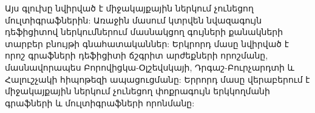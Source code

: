 Այս գլուխը նվիրված է միջակայքային ներկում չունեցող մուլտիգրաֆներին: Առաջին մասում կտրվեն նվազագույն դեֆիցիտով ներկումներում մասնակցող գույների քանակների տարբեր բնույթի գնահատականներ: 
Երկրորդ մասը նվիրված է որոշ գրաֆների դեֆիցիտի ճշգրիտ արժեքների որոշմանը, մասնավորապես Բորովիցկա-Օլշեվսկայի, Դրգաշ-Բուրչարդտի և Հալուշչակի հիպոթեզի ապացուցմանը:
Երրորդ մասը վերաբերում է միջակայքային ներկում չունեցող փոքրագույն երկկողմանի գրաֆների և մուլտիգրաֆների որոնմանը: 
